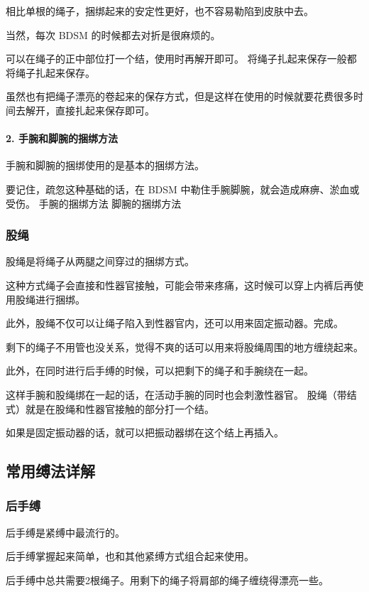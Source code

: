 \documentclass[12pt,UTF8]{ctexbook}
\begin{document}
相比单根的绳子，捆绑起来的安定性更好，也不容易勒陷到皮肤中去。

当然，每次 BDSM 的时候都去对折是很麻烦的。

可以在绳子的正中部位打一个结，使用时再解开即可。 将绳子扎起来保存一般都将绳子扎起来保存。

虽然也有把绳子漂亮的卷起来的保存方式，但是这样在使用的时候就要花费很多时间去解开，直接扎起来保存即可。

\paragraph{2. 手腕和脚腕的捆绑方法}

手腕和脚腕的捆绑使用的是基本的捆绑方法。

要记住，疏忽这种基础的话，在 BDSM 中勒住手腕脚腕，就会造成麻痹、淤血或受伤。 手腕的捆绑方法 脚腕的捆绑方法

\subsubsection{股绳}

股绳是将绳子从两腿之间穿过的捆绑方式。

这种方式绳子会直接和性器官接触，可能会带来疼痛，这时候可以穿上内裤后再使用股绳进行捆绑。

此外，股绳不仅可以让绳子陷入到性器官内，还可以用来固定振动器。完成。

剩下的绳子不用管也没关系，觉得不爽的话可以用来将股绳周围的地方缠绕起来。

此外，在同时进行后手缚的时候，可以把剩下的绳子和手腕绕在一起。

这样手腕和股绳绑在一起的话，在活动手腕的同时也会刺激性器官。 股绳（带结式）就是在股绳和性器官接触的部分打一个结。

如果是固定振动器的话，就可以把振动器绑在这个结上再插入。

\subsection{常用缚法详解}

\subsubsection{后手缚}

后手缚是紧缚中最流行的。

后手缚掌握起来简单，也和其他紧缚方式组合起来使用。

后手缚中总共需要2根绳子。用剩下的绳子将肩部的绳子缠绕得漂亮一些。
\end{document}
